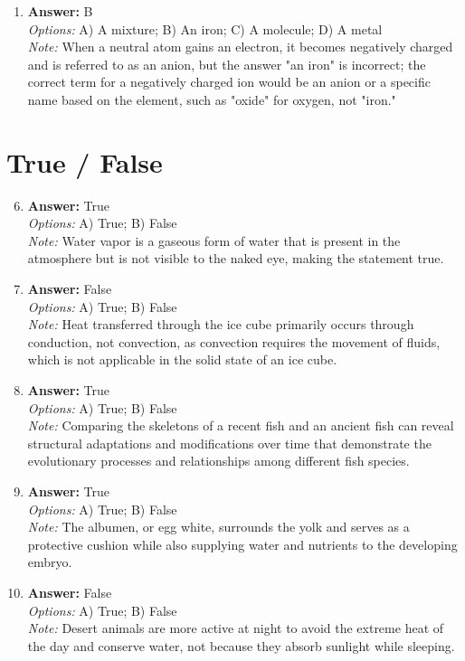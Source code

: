 \documentclass[12pt]{article}
\begin{document}
\begin{enumerate}[label=\arabic*.]
\item \textbf{Answer:} B
\\ \textit{Options:} A) A mixture; B) An iron; C) A molecule; D) A metal
\\ \textit{Note:} When a neutral atom gains an electron, it becomes negatively charged and is referred to as an anion, but the answer "an iron" is incorrect; the correct term for a negatively charged ion would be an anion or a specific name based on the element, such as "oxide" for oxygen, not "iron."
\end{enumerate}

\section*{True / False}
\begin{enumerate}[label=\arabic*.]
\setcounter{enumi}{5}
\item \textbf{Answer:} True
\\ \textit{Options:} A) True; B) False
\\ \textit{Note:} Water vapor is a gaseous form of water that is present in the atmosphere but is not visible to the naked eye, making the statement true.
\item \textbf{Answer:} False
\\ \textit{Options:} A) True; B) False
\\ \textit{Note:} Heat transferred through the ice cube primarily occurs through conduction, not convection, as convection requires the movement of fluids, which is not applicable in the solid state of an ice cube.
\item \textbf{Answer:} True
\\ \textit{Options:} A) True; B) False
\\ \textit{Note:} Comparing the skeletons of a recent fish and an ancient fish can reveal structural adaptations and modifications over time that demonstrate the evolutionary processes and relationships among different fish species.
\item \textbf{Answer:} True
\\ \textit{Options:} A) True; B) False
\\ \textit{Note:} The albumen, or egg white, surrounds the yolk and serves as a protective cushion while also supplying water and nutrients to the developing embryo.
\item \textbf{Answer:} False
\\ \textit{Options:} A) True; B) False
\\ \textit{Note:} Desert animals are more active at night to avoid the extreme heat of the day and conserve water, not because they absorb sunlight while sleeping.
\end{enumerate}
\end{document}

